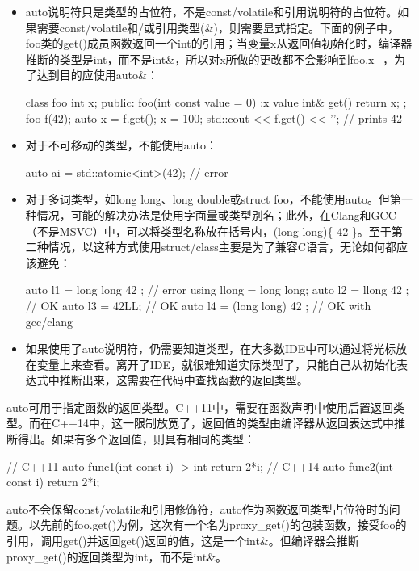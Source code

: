 \begin{itemize}
\item
auto说明符只是类型的占位符，不是const/volatile和引用说明符的占位符。如果需要const/volatile和/或引用类型(\&)，则需要显式指定。下面的例子中，foo类的get()成员函数返回一个int的引用；当变量x从返回值初始化时，编译器推断的类型是int，而不是int\&，所以对x所做的更改都不会影响到foo.x\_，为了达到目的应使用auto\&：

\begin{cpp}
class foo {
    int x;
public:
    foo(int const value = 0) :x{ value } {}
    int& get() { return x; }
};
foo f(42);
auto x = f.get();
x = 100;
std::cout << f.get() << '\n'; // prints 42
\end{cpp}

\item
对于不可移动的类型，不能使用auto：

\begin{cpp}
auto ai = std::atomic<int>(42); // error
\end{cpp}

\item
对于多词类型，如long long、long double或struct foo，不能使用auto。但第一种情况，可能的解决办法是使用字面量或类型别名；此外，在Clang和GCC（不是MSVC）中，可以将类型名称放在括号内，(long long)\{ 42 \}。至于第二种情况，以这种方式使用struct/class主要是为了兼容C语言，无论如何都应该避免：

\begin{cpp}
auto l1 = long long{ 42 }; // error
using llong = long long;
auto l2 = llong{ 42 };     // OK
auto l3 = 42LL;            // OK
auto l4 = (long long){ 42 }; // OK with gcc/clang
\end{cpp}

\item
如果使用了auto说明符，仍需要知道类型，在大多数IDE中可以通过将光标放在变量上来查看。离开了IDE，就很难知道实际类型了，只能自己从初始化表达式中推断出来，这需要在代码中查找函数的返回类型。
\end{itemize}

auto可用于指定函数的返回类型。C++11中，需要在函数声明中使用后置返回类型。而在C++14中，这一限制放宽了，返回值的类型由编译器从返回表达式中推断得出。如果有多个返回值，则具有相同的类型：

\begin{cpp}
// C++11
auto func1(int const i) -> int
{ return 2*i; }
// C++14
auto func2(int const i)
{ return 2*i; }
\end{cpp}

auto不会保留const/volatile和引用修饰符，auto作为函数返回类型占位符时的问题。以先前的foo.get()为例，这次有一个名为proxy\_get()的包装函数，接受foo的引用，调用get()并返回get()返回的值，这是一个int\&。但编译器会推断proxy\_get()的返回类型为int，而不是int\&。

